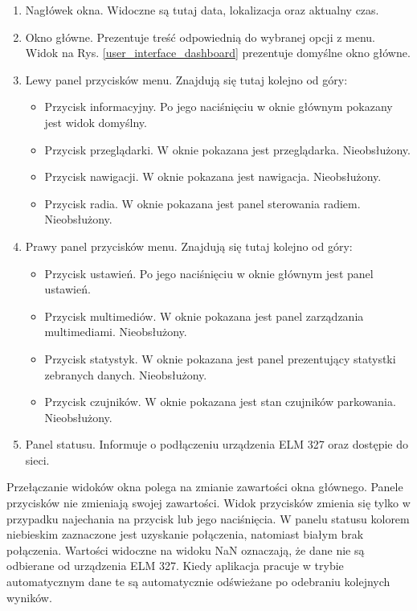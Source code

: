 \documentclass[12pt, twoside]{article} %
\numberwithin{equation}{subsection}
\numberwithin{figure}{section}
\numberwithin{table}{section}
\begin{document}
		\begin{enumerate}
			\item{Nagłówek okna. Widoczne są tutaj data, lokalizacja oraz aktualny czas.}
			\item{Okno główne. Prezentuje treść odpowiednią do wybranej opcji z menu. Widok na Rys. \ref{user_interface_dashboard} prezentuje domyślne okno główne.}
			\item{Lewy panel przycisków menu. Znajdują się tutaj kolejno od góry:
				\begin{itemize}
					\item{Przycisk informacyjny. Po jego naciśnięciu w oknie głównym pokazany jest widok domyślny.}
					\item{Przycisk przeglądarki. W oknie pokazana jest przeglądarka. Nieobsłużony.}
					\item{Przycisk nawigacji. W oknie pokazana jest nawigacja. Nieobsłużony.}
					\item{Przycisk radia. W oknie pokazana jest panel sterowania radiem. Nieobsłużony.}
				\end{itemize}						
			}
			\item{Prawy panel przycisków menu. Znajdują się tutaj kolejno od góry:
				\begin{itemize}
					\item{Przycisk ustawień. Po jego naciśnięciu w oknie głównym jest panel ustawień.}
					\item{Przycisk multimediów. W oknie pokazana jest panel zarządzania multimediami. Nieobsłużony.}
					\item{Przycisk statystyk. W oknie pokazana jest panel prezentujący statystki zebranych danych. Nieobsłużony.}
					\item{Przycisk czujników. W oknie pokazana jest stan czujników parkowania. Nieobsłużony.}
				\end{itemize}						
			}
			\item{Panel statusu. Informuje o podłączeniu urządzenia ELM 327 oraz dostępie do sieci.}
		\end{enumerate}
		
		Przełączanie widoków okna polega na zmianie zawartości okna głównego. Panele przycisków nie zmieniają swojej zawartości. Widok przycisków zmienia się tylko w przypadku najechania na przycisk lub jego naciśnięcia. W panelu statusu kolorem niebieskim zaznaczone jest uzyskanie połączenia, natomiast białym brak połączenia. Wartości widoczne na widoku NaN oznaczają, że dane nie są odbierane od urządzenia ELM 327. Kiedy aplikacja pracuje w trybie automatycznym dane te są automatycznie odświeżane po odebraniu kolejnych wyników. 
		
\end{document}
